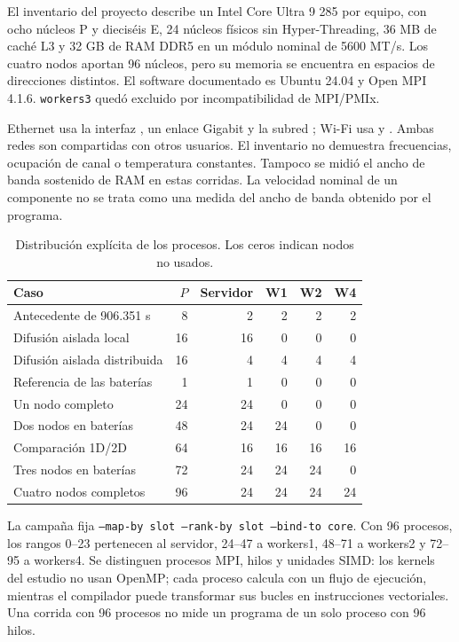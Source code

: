 El inventario del proyecto describe un Intel Core Ultra 9 285 por equipo, con ocho núcleos P y dieciséis E, 24 núcleos físicos sin Hyper-Threading, 36 MB de caché L3 y 32 GB de RAM DDR5 en un módulo nominal de 5600 MT/s. Los cuatro nodos aportan 96 núcleos, pero su memoria se encuentra en espacios de direcciones distintos. El software documentado es Ubuntu 24.04 y Open MPI 4.1.6. \texttt{workers3} quedó excluido por incompatibilidad de MPI/PMIx.

Ethernet usa la interfaz , un enlace Gigabit y la subred ; Wi-Fi usa  y . Ambas redes son compartidas con otros usuarios. El inventario no demuestra frecuencias, ocupación de canal o temperatura constantes. Tampoco se midió el ancho de banda sostenido de RAM en estas corridas. La velocidad nominal de un componente no se trata como una medida del ancho de banda obtenido por el programa.

\begin{table}[H]\centering\small
\caption{Distribución explícita de los procesos. Los ceros indican nodos no usados.}\label{tab:reparto}
\begin{tabularx}{\linewidth}{Xrrrrr}
\toprule Caso & $P$ & Servidor & W1 & W2 & W4 \\
\midrule
Antecedente de 906.351 s & 8 & 2 & 2 & 2 & 2 \\
Difusión aislada local & 16 & 16 & 0 & 0 & 0 \\
Difusión aislada distribuida & 16 & 4 & 4 & 4 & 4 \\
Referencia de las baterías & 1 & 1 & 0 & 0 & 0 \\
Un nodo completo & 24 & 24 & 0 & 0 & 0 \\
Dos nodos en baterías & 48 & 24 & 24 & 0 & 0 \\
Comparación 1D/2D & 64 & 16 & 16 & 16 & 16 \\
Tres nodos en baterías & 72 & 24 & 24 & 24 & 0 \\
Cuatro nodos completos & 96 & 24 & 24 & 24 & 24 \\
\bottomrule
\end{tabularx}
\end{table}

La campaña fija \texttt{--map-by slot --rank-by slot --bind-to core}. Con 96 procesos, los rangos 0--23 pertenecen al servidor, 24--47 a workers1, 48--71 a workers2 y 72--95 a workers4. Se distinguen procesos MPI, hilos y unidades SIMD: los kernels del estudio no usan OpenMP; cada proceso calcula con un flujo de ejecución, mientras el compilador puede transformar sus bucles en instrucciones vectoriales. Una corrida con 96 procesos no mide un programa de un solo proceso con 96 hilos.

